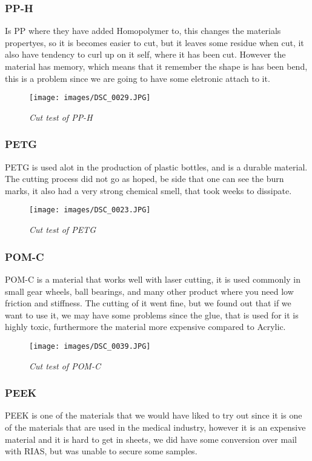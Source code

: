 \subsubsection{PP-H}
Is PP where they have added Homopolymer to, this changes the materials propertyes, so it is becomes easier to cut, but it leaves some residue when cut, it also have tendency to curl up on it self, where it has been cut.
However the material has memory, which means that it remember the shape is has been bend, this is a problem since we are going to have some eletronic attach to it.
\begin{figure}[!h]
	\centering
	\texttt{[image: images/DSC\_0029.JPG]}
	\caption{\small {\it {Cut test of PP-H}}} \label{fig:explode}
\end{figure}
\FloatBarrier
\subsubsection{PETG}
PETG is used alot in the production of plastic bottles, and is a durable material.
The cutting process did not go as hoped, be side that one can see the burn marks, it also had a very strong chemical smell, that took weeks to dissipate.
\begin{figure}[!h]
	\centering
	\texttt{[image: images/DSC\_0023.JPG]}
	\caption{\small {\it {Cut test of PETG}}} \label{fig:explode}
\end{figure}
\FloatBarrier
\subsubsection{POM-C}
POM-C is a material that works well with laser cutting, it is used commonly in small gear wheels, ball bearings, and many other product where you need low friction and stiffness.
The cutting of it went fine, but we found out that if we want to use it, we may have some problems since the glue, that is used for it is highly toxic, furthermore the material more expensive compared to Acrylic.
\begin{figure}[!h]
	\centering
	\texttt{[image: images/DSC\_0039.JPG]}
	\caption{\small {\it {Cut test of POM-C}}} \label{fig:explode}
\end{figure}
\FloatBarrier

\subsubsection{PEEK}
PEEK is one of the materials that we would have liked to try out since it is one of the materials that are used in the medical industry, however it is an expensive material and it is hard to get in sheets, we did have some conversion over mail with RIAS, but was unable to secure some samples.

